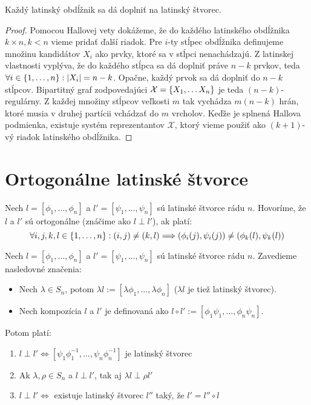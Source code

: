\begin{theorem}
    Každý latinský obdĺžnik sa dá doplniť na latinský štvorec.
\end{theorem}
\begin{proof}
    Pomocou Hallovej vety dokážeme, že do každého latinského obdĺžnika $k \times n, k < n$ vieme pridať ďalší riadok.
    Pre $i$-ty stĺpec obdĺžnika definujeme množinu kandidátov $X_i$ ako prvky, ktoré sa v stĺpci nenachádzajú.
    Z latinskej vlastnosti vyplýva, že do každého stĺpca sa dá doplniť práve $n-k$ prvkov, 
    teda $\forall i \in \left\{1, \ldots, n\right\}: |X_i| = n-k$. Opačne, každý prvok sa dá doplniť do $n-k$ stĺpcov. 
    Bipartitný graf zodpovedajúci $\mathcal{X} = \left\{X_1, \ldots X_n\right\}$ je teda $(n-k)$-regulárny. 
    Z každej množiny stĺpcov veľkosti $m$ tak vychádza $m(n-k)$ hrán, ktoré musia v druhej partícii vchádzať do $m$ vrcholov. 
    Keďže je splnená Hallova podmienka, existuje systém reprezentantov $\mathcal{X}$, ktorý vieme použiť ako $(k+1)$-vý riadok
    latinského obdĺžnika.
\end{proof}

\section{Ortogonálne latinské štvorce}

\begin{definition}
Nech $l = [\phi_1, \ldots, \phi_n]$ a $l' = [\psi_1, \ldots, \psi_n]$ sú latinské štvorce rádu $n$. Hovoríme, že
$l$ a $l'$ sú ortogonálne (znáčime ako $l \perp l'$), ak platí: 
$$\forall i,j,k,l \in \left\{1, \ldots, n\right\}: (i, j) \neq (k, l) \Longrightarrow (\phi_i(j), \psi_i(j)) \neq  (\phi_k(l), \psi_k(l))$$

\end{definition}


\begin{theorem}
Nech $l = [\phi_1, \ldots, \phi_n]$ a $l' = [\psi_1, \ldots, \psi_n]$ sú latinské štvorce rádu $n$.
Zavedieme nasledovné značenia:
\begin{itemize}
    \item Nech $\lambda \in S_n$, potom $\lambda l := [\lambda \phi_1, \ldots, \lambda \phi_n]$ ($\lambda l$ je tiež latinský štvorec). 
    \item Nech kompozícia $l$ a $l'$ je definovaná ako $l \circ l' := [\phi_1 \psi_1, \ldots, \phi_n \psi_n]$.
\end{itemize}

Potom platí:

\begin{enumerate}
    \item $l \perp l' \Leftrightarrow [\psi_1 \phi_1^{-1}, \ldots, \psi_n \phi_n^{-1}]$ je latinský štvorec
    \item Ak $\lambda, \rho \in S_n$ a $l \perp l'$,  tak aj $\lambda l \perp \rho l'$
    \item $l \perp l' \Leftrightarrow$ existuje latinský štvorec $l''$ taký, že $l' = l'' \circ l$ 
\end{enumerate}
    
\end{theorem}

